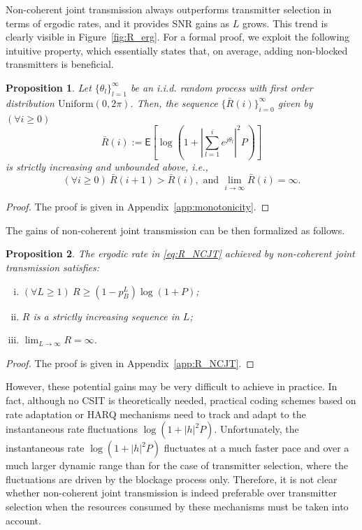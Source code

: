 \documentclass[10pt,journal,a4paper]{IEEEtran}
\newcommand{\eqdef}{:=}
\newcommand{\E}{\mathsf{E}}		%
\newtheorem{proposition}{Proposition}
\begin{document}
Non-coherent joint transmission always outperforms transmitter selection in terms of ergodic rates, and it provides SNR gains as $L$ grows. This trend is clearly visible in Figure~\ref{fig:R_erg}. For a formal proof, we exploit the following intuitive property, which essentially states that, on average, adding non-blocked transmitters is beneficial.
\begin{proposition}\label{prop:monotonicity}
Let $\{\theta_l\}_{l=1}^\infty$ be an i.i.d. random process with first order distribution $\mathrm{Uniform}(0,2\pi)$. Then, the sequence $\{\bar{R}(i)\}_{i=0}^\infty$ given by $(\forall i \geq 0)$ 
\begin{equation}\label{eq:barR}
\bar{R}(i) \eqdef \E\left[\log\left(1+\left|\textstyle\sum_{l=1}^ie^{j\theta_l}\right|^2P\right)\right]
\end{equation}
is strictly increasing and unbounded above, i.e., 
\begin{equation*}
(\forall i\geq 0)~\bar{R}(i+1) > \bar{R}(i), \text{ and }\lim_{i\to \infty}\bar{R}(i)= \infty.
\end{equation*} 
\end{proposition}
\begin{proof}
The proof is given in Appendix~\ref{app:monotonicity}. 
\end{proof}
The gains of non-coherent joint transmission can be then formalized as follows.
\begin{proposition}\label{prop:R_NCJT}
The ergodic rate in \eqref{eq:R_NCJT} achieved by non-coherent joint transmission satisfies: 
\begin{enumerate}[(i)]
\item $(\forall L\geq 1)~R \geq (1-p_B^L)\log(1+P)$;
\item $R$ is a strictly increasing sequence in $L$;
\item $\lim_{L\to \infty} R = \infty$.
\end{enumerate}
\end{proposition}
\begin{proof}
The proof is given in Appendix~\ref{app:R_NCJT}.
\end{proof}
However, these potential gains may be very difficult to achieve in practice. In fact, although no CSIT is theoretically needed, practical coding schemes based on rate adaptation or HARQ mechanisms need to track and adapt to the instantaneous rate fluctuations $\log(1+|h|^2P)$. Unfortunately, the instantaneous rate $\log(1+|h|^2P)$ fluctuates at a much faster pace and over a much larger dynamic range than for the case of transmitter selection, where the fluctuations are driven by the blockage process only. Therefore, it is not clear whether non-coherent joint transmission is indeed preferable over transmitter selection when the resources consumed by these mechanisms must be taken into account. 
\end{document}
